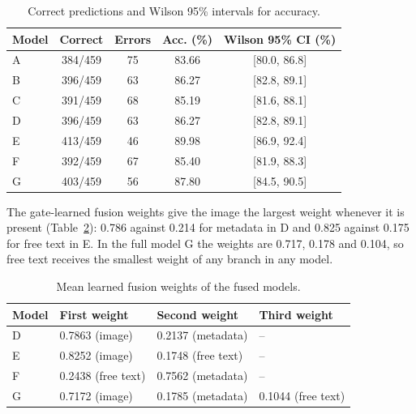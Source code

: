 \documentclass[conference]{IEEEtran}
\begin{document}
\begin{table}[!t]
\caption{Correct predictions and Wilson 95\% intervals for accuracy.}
\label{tab:ci}
\centering\scriptsize\setlength{\tabcolsep}{3pt}
\begin{tabular}{lcccc}
\toprule
Model & Correct & Errors & Acc. (\%) & Wilson 95\% CI (\%) \\
\midrule
A & 384/459 & 75 & 83.66 & [80.0, 86.8] \\
B & 396/459 & 63 & 86.27 & [82.8, 89.1] \\
C & 391/459 & 68 & 85.19 & [81.6, 88.1] \\
D & 396/459 & 63 & 86.27 & [82.8, 89.1] \\
E & 413/459 & 46 & 89.98 & [86.9, 92.4] \\
F & 392/459 & 67 & 85.40 & [81.9, 88.3] \\
G & 403/459 & 56 & 87.80 & [84.5, 90.5] \\
\bottomrule
\end{tabular}
\end{table}


The gate-learned fusion weights give the image the largest weight whenever it is present (Table~\ref{tab:weights}): 0.786 against 0.214 for metadata in D and 0.825 against 0.175 for free text in E. In the full model G the weights are 0.717, 0.178 and 0.104, so free text receives the smallest weight of any branch in any model.

\begin{table}[!t]
\caption{Mean learned fusion weights of the fused models.}
\label{tab:weights}
\centering\scriptsize\setlength{\tabcolsep}{3pt}
\begin{tabular}{llll}
\toprule
Model & First weight & Second weight & Third weight \\
\midrule
D & 0.7863 (image) & 0.2137 (metadata) & -- \\
E & 0.8252 (image) & 0.1748 (free text) & -- \\
F & 0.2438 (free text) & 0.7562 (metadata) & -- \\
G & 0.7172 (image) & 0.1785 (metadata) & 0.1044 (free text) \\
\bottomrule
\end{tabular}
\end{table}
\end{document}
